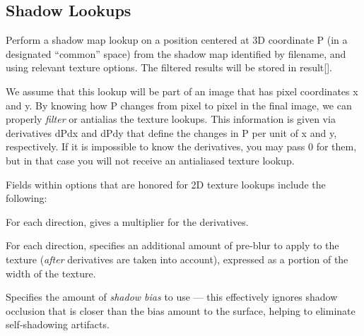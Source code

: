 \subsection{Shadow Lookups}
\label{sec:texturesys:api:shadow}


Perform a shadow map lookup on a position centered at 3D
coordinate {\cf P} (in a designated ``common'' space) from the shadow map identified by
{\cf filename}, and using relevant texture {\cf options}.  The filtered
results will be stored in {\cf result[]}.

We assume that this lookup will be part of an image that has pixel
coordinates {\cf x} and {\cf y}.  By knowing how {\cf P} changes from
pixel to pixel in the final image, we can properly \emph{filter} or
antialias the texture lookups.  This information is given via
derivatives {\cf dPdx} and {\cf dPdy} that define the changes in {\cf P}
per unit of {\cf x} and {\cf y}, respectively.  If it is impossible to
know the derivatives, you may pass 0 for them, but in that case you will
not receive an antialiased texture lookup.

Fields within {\cf options} that are honored for 2D texture lookups
include the following:

\vspace{-12pt}
\vspace{10pt}
For each direction, gives a multiplier for the derivatives.
\apiend

\vspace{-24pt}
\vspace{10pt}
For each direction, specifies an additional amount of pre-blur to apply
to the texture (\emph{after} derivatives are taken into account),
expressed as a portion of the width of the texture.
\apiend

\vspace{-24pt}
\vspace{10pt}
Specifies the amount of \emph{shadow bias} to use --- this effectively
ignores shadow occlusion that is closer than the bias amount to the
surface, helping to eliminate self-shadowing artifacts.
\apiend

